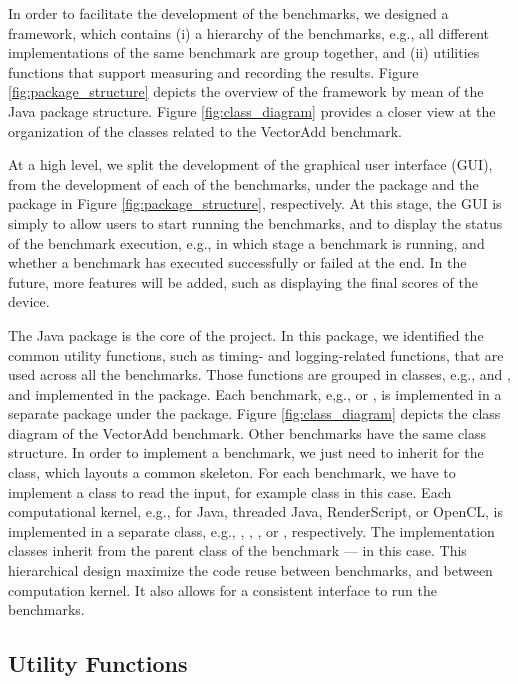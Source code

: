 In order to facilitate the development of the benchmarks, we designed a
framework,  which contains (i) a hierarchy of the benchmarks, e.g.,
all different implementations of the same benchmark are group together, and
(ii) utilities functions that support measuring and recording the results.
Figure \ref{fig:package_structure} depicts the overview of the framework by mean
of the Java package structure. Figure \ref{fig:class_diagram} provides a closer
view at the organization of the classes related to the VectorAdd benchmark.

At a high level, we split the development of the graphical user interface (GUI),
from the development of each of the benchmarks, under the  package and
the  package in Figure \ref{fig:package_structure}, respectively.
At this stage, the GUI is simply to allow users to start running the benchmarks,
and to display the status of the benchmark execution, e.g., in which stage a
benchmark is running, and whether a benchmark has executed successfully or
failed at the end. In the future, more features will be added, such as
displaying the final scores of the device.

The  Java package is the core of the project. In this package, we
identified the common utility functions, such as timing- and logging-related
functions, that are used across all the benchmarks. Those functions are grouped
in classes, e.g.,  and , and implemented in the
 package. Each benchmark, e,g.,  or , is
implemented in a separate package under the  package.  Figure
\ref{fig:class_diagram} depicts the class diagram of the VectorAdd benchmark.
Other benchmarks have the same class structure. In order to implement a
benchmark, we just need to inherit for the  class, which
layouts a common skeleton. For each benchmark, we have to implement a class to
read the input, for example  class in this case. Each
computational kernel, e.g., for Java, threaded Java, RenderScript, or OpenCL, is
implemented in a separate class, e.g., ,
, , or ,
respectively. The implementation classes inherit from the parent class of the benchmark ---
 in this case. This hierarchical design
maximize the code reuse between benchmarks, and between computation kernel.  It
also allows for a consistent interface to run the benchmarks.


\subsection{Utility Functions}
